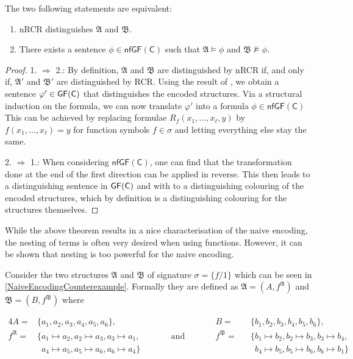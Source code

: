 \begin{theorem}
	\label{thm:ThmA}
	The two following statements are equivalent:
	\begin{enumerate}
		\item nRCR distinguishes $\mathfrak A$ and $\mathfrak B$.
		\item There exists a sentence $\phi\in \mathsf{nfGF}(\mathsf C)$ such that $\mathfrak A\models \phi$ and $\mathfrak B\not\models \phi$.
	\end{enumerate}
\end{theorem}
\begin{proof}
	1. $\Rightarrow$ 2.:
	By definition, $\mathfrak A$ and $\mathfrak B$ are distinguished by nRCR if, and only if, $\mathfrak A'$ and $\mathfrak B'$ are distinguished by RCR.
	Using the result of \cite{scheidt2025ColorRefinement}, we obtain a sentence $\varphi'\in\mathsf{GF}(\mathsf{C})$ that distinguishes the encoded structures.
	Via a structural induction on the formula, we can now translate $\varphi'$ into a formula $\phi\in \mathsf{nfGF}(\mathsf C)$
	This can be achieved by replacing formulae $R_f(x_1,\dots,x_\ell,y)$ by $f(x_1,\dots,x_\ell)=y$ for function symbols $f\in\sigma$ and letting everything else stay the same.
	
	2. $\Rightarrow$ 1.:
	When considering $\mathsf{nfGF}(\mathsf C)$, one can find that the transformation done at the end of the first direction can be applied in reverse.
	This then leads to a distinguishing sentence in $\mathsf{GF}(\mathsf{C})$ and with \cite{scheidt2025ColorRefinement} to a distinguishing colouring of the encoded structures, which by definition is a distinguishing colouring for the structures themselves.
\end{proof}

While the above theorem results in a nice characterisation of the naive encoding, the nesting of terms is often very desired when using functions.
However, it can be shown that nesting is too powerful for the naive encoding.

Consider the two structures $\mathfrak A$ and $\mathfrak B$ of signature $\sigma=\{f/1\}$ which can be seen in \cref{NaiveEncodingCounterexample}.
Formally they are defined as $\mathfrak A=(A,f^{\mathfrak A})$ and $\mathfrak B = (B, f^{\mathfrak B})$ where

\begin{alignat*}{4}
	A=&\{a_1,a_2,a_3,a_4,a_5,a_6\}, &&  && B=&&\{b_1,b_2,b_3,b_4,b_5,b_6\},\\
	f^{\mathfrak A}=&\{a_1\mapsto a_2, a_2\mapsto a_3, a_3 \mapsto a_1, && \qquad \text{and} \qquad && f^{\mathfrak B}=&&\{b_1 \mapsto b_2, b_2 \mapsto b_3, b_3 \mapsto b_4, \\
	&\phantom{\{} a_4\mapsto a_5, a_5\mapsto a_6, a_6\mapsto a_4 \} &&  && && \phantom{\{} b_4 \mapsto b_5, b_5 \mapsto b_6, b_6 \mapsto b_1\}
\end{alignat*}

